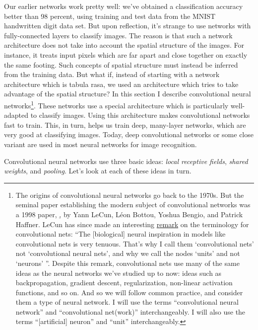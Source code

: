 \documentclass[a4paper,twoside,10pt]{book}
\begin{document}
Our earlier networks work pretty well: we've obtained a classification accuracy better than 98 percent, using training and test data from the MNIST handwritten digit data set. But upon reflection, it's strange to use networks with fully-connected layers to classify images. The reason is that such a network architecture does not take into account the spatial structure of the images. For instance, it treats input pixels which are far apart and close together on exactly the same footing. Such concepts of spatial structure must instead be inferred from the training data. But what if, instead of starting with a network architecture which is tabula rasa, we used an architecture which tries to take advantage of the spatial structure? In this section I describe convolutional neural networks\footnote{The origins of convolutional neural networks go back to the 1970s. But the seminal paper establishing the modern subject of convolutional networks was a 1998 paper, \href{``Gradient-based learning applied to document recognition''}, by Yann LeCun, L\'eon Bottou, Yoshua Bengio, and Patrick Haffner. LeCun has since made an interesting \href{https://www.facebook.com/yann.lecun/posts/10152348155137143}{remark} on the terminology for convolutional nets: ``The [biological] neural inspiration in models like convolutional nets is very tenuous. That's why I call them `convolutional nets' not `convolutional neural nets', and why we call the nodes `units' and not `neurons' ''. Despite this remark, convolutional nets use many of the same ideas as the neural networks we've studied up to now: ideas such as backpropagation, gradient descent, regularization, non-linear activation functions, and so on. And so we will follow common practice, and consider them a type of neural network. I will use the terms ``convolutional neural network'' and ``convolutional net(work)'' interchangeably. I will also use the terms ``[artificial] neuron'' and ``unit'' interchangeably.}. These networks use a special architecture which is particularly well-adapted to classify images. Using this architecture makes convolutional networks fast to train. This, in turn, helps us train deep, many-layer networks, which are very good at classifying images. Today, deep convolutional networks or some close variant are used in most neural networks for image recognition.

Convolutional neural networks use three basic ideas: \textit{local receptive fields}, \textit{shared weights}, and \textit{pooling}. Let's look at each of these ideas in turn.
\end{document}
